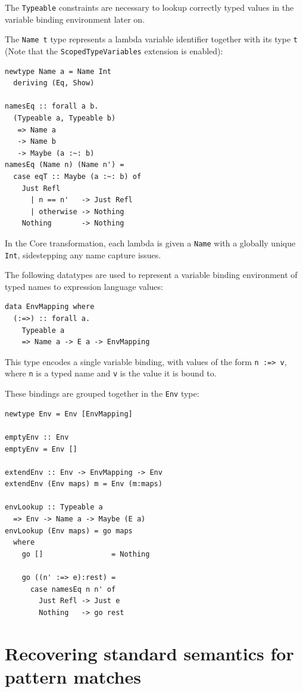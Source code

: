 \documentclass[sigplan,anonymous,review]{acmart}
\newcommand{\ttt}{\texttt}
\begin{document}
The \ttt{Typeable} constraints are necessary to lookup correctly typed
values in the variable binding environment later on.

The \ttt{Name t} type represents a lambda variable identifier together with its
type \ttt{t} (Note that the \ttt{ScopedTypeVariables} extension is enabled):

\begin{lstlisting}
newtype Name a = Name Int
  deriving (Eq, Show)

namesEq :: forall a b.
  (Typeable a, Typeable b)
   => Name a
   -> Name b
   -> Maybe (a :~: b)
namesEq (Name n) (Name n') =
  case eqT :: Maybe (a :~: b) of
    Just Refl
      | n == n'   -> Just Refl
      | otherwise -> Nothing
    Nothing       -> Nothing
\end{lstlisting}

In the Core transformation, each lambda is given a \ttt{Name} with a globally
unique \ttt{Int}, sidestepping any name capture issues.

The following datatypes are used to represent a variable binding environment
of typed names to expression language values:

\begin{lstlisting}
data EnvMapping where
  (:=>) :: forall a.
    Typeable a
    => Name a -> E a -> EnvMapping
\end{lstlisting}

This type encodes a single variable binding, with values of the form
\ttt{n :=> v}, where \ttt{n} is a typed name and \ttt{v} is the value it is bound to.

These bindings are grouped together in the \ttt{Env} type:
\newpage
\begin{lstlisting}
newtype Env = Env [EnvMapping]

emptyEnv :: Env
emptyEnv = Env []

extendEnv :: Env -> EnvMapping -> Env
extendEnv (Env maps) m = Env (m:maps)

envLookup :: Typeable a
  => Env -> Name a -> Maybe (E a)
envLookup (Env maps) = go maps
  where
    go []                = Nothing

    go ((n' :=> e):rest) =
      case namesEq n n' of
        Just Refl -> Just e
        Nothing   -> go rest
\end{lstlisting}


\section{Recovering standard semantics for pattern matches}
\label{sec:StdSemantics}
\end{document}
